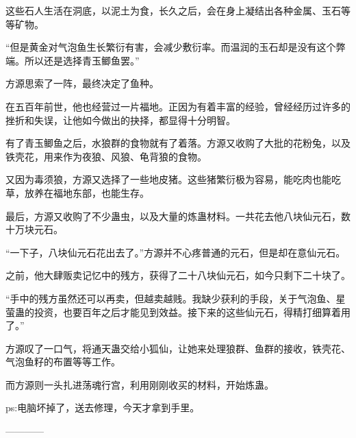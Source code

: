 \begin{this_body}
这些石人生活在洞底，以泥土为食，长久之后，会在身上凝结出各种金属、玉石等等矿物。

“但是黄金对气泡鱼生长繁衍有害，会减少敷衍率。而温润的玉石却是没有这个弊端。所以还是选择青玉鲫鱼罢。”

方源思索了一阵，最终决定了鱼种。

在五百年前世，他也经营过一片福地。正因为有着丰富的经验，曾经经历过许多的挫折和失误，让他如今做出的抉择，都显得十分明智。

有了青玉鲫鱼之后，水狼群的食物就有了着落。方源又收购了大批的花粉兔，以及铁壳花，用来作为夜狼、风狼、龟背狼的食物。

又因为毒须狼，方源又选择了一些地皮猪。这些猪繁衍极为容易，能吃肉也能吃草，放养在福地东部，也能生存。

最后，方源又收购了不少蛊虫，以及大量的炼蛊材料。一共花去他八块仙元石，数十万块元石。

“一下子，八块仙元石花出去了。”方源并不心疼普通的元石，但是却在意仙元石。

之前，他大肆贩卖记忆中的残方，获得了二十八块仙元石，如今只剩下二十块了。

“手中的残方虽然还可以再卖，但越卖越贱。我缺少获利的手段，关于气泡鱼、星萤蛊的投资，也要百年之后才能见到效益。接下来的这些仙元石，得精打细算着用了。”

方源叹了一口气，将通天蛊交给小狐仙，让她来处理狼群、鱼群的接收，铁壳花、气泡鱼籽的布置等等工作。

而方源则一头扎进荡魂行宫，利用刚刚收买的材料，开始炼蛊。

ps:电脑坏掉了，送去修理，今天才拿到手里。

------------

\end{this_body}

